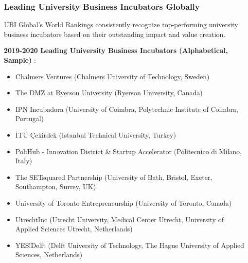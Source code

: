 \documentclass[../Main.tex]{subfiles}
\begin{document}
	\subsubsection{Leading University Business Incubators Globally}
	UBI Global's World Rankings consistently recognize top-performing university business incubators based on their outstanding impact and value creation.
	
	\textbf{2019-2020 Leading University Business Incubators (Alphabetical, Sample)} \cite{ubi2019world}:
	\begin{itemize}
		\item Chalmers Ventures (Chalmers University of Technology, Sweden)
		\item The DMZ at Ryerson University (Ryerson University, Canada)
		\item IPN Incubadora (University of Coimbra, Polytechnic Institute of Coimbra, Portugal)
		\item İTÜ Çekirdek (Istanbul Technical University, Turkey)
		\item PoliHub - Innovation District \& Startup Accelerator (Politecnico di Milano, Italy)
		\item The SETsquared Partnership (University of Bath, Bristol, Exeter, Southampton, Surrey, UK)
		\item University of Toronto Entrepreneurship (University of Toronto, Canada)
		\item UtrechtInc (Utrecht University, Medical Center Utrecht, University of Applied Sciences Utrecht, Netherlands)
		\item YES!Delft (Delft University of Technology, The Hague University of Applied Sciences, Netherlands)
	\end{itemize}
	
\end{document}
